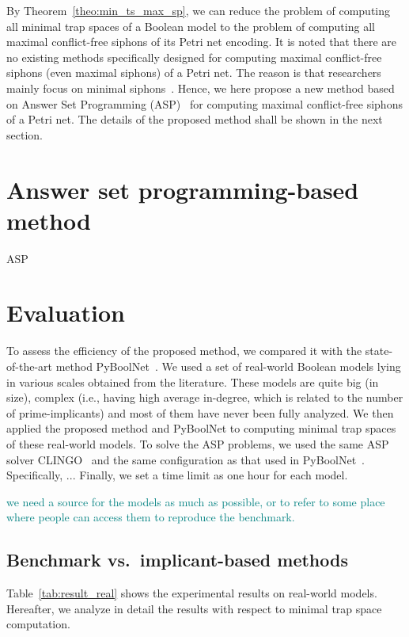 \documentclass[runningheads]{llncs}
\newcommand{\sylvain}[1]{\textcolor{teal}{#1}}
\begin{document}
By Theorem~\ref{theo:min_ts_max_sp}, we can reduce the problem of computing all minimal trap spaces of a Boolean model to the problem of computing all maximal conflict-free siphons of its Petri net encoding. It is noted that there are no existing methods specifically designed for computing maximal conflict-free siphons (even maximal siphons) of a Petri net. The reason is that researchers mainly focus on minimal siphons~\cite{DBLP:journals/isci/LiuB16}. Hence, we here propose a new method based on Answer Set Programming (ASP)~\cite{DBLP:journals/aicom/GebserKKOSS11} for computing  maximal conflict-free siphons of a Petri net. The details of the proposed method shall be shown in the next section.

\section{Answer set programming-based method}

ASP

\section{Evaluation}
To assess the efficiency of the proposed method, we compared it with the state-of-the-art method PyBoolNet~\cite{klarner2017pyboolnet}.
We used a set of real-world Boolean models lying in various scales obtained from the literature.
These models are quite big (in size), complex (i.e., having high average in-degree, which is related to the number of prime-implicants) and most of them have never been fully analyzed.
We then applied the proposed method and PyBoolNet to computing minimal trap spaces of these real-world models.
To solve the ASP problems, we used the same ASP solver CLINGO~\cite{DBLP:journals/aicom/GebserKKOSS11} and the same configuration as that used in PyBoolNet~\cite{klarner2015computing}.
Specifically, ...
Finally, we set a time limit as one hour for each model.

\sylvain{we need a source for the models as much as possible, or to refer to some place where people can access them to reproduce the benchmark.}

\subsection{Benchmark vs.\ implicant-based methods}

Table~\ref{tab:result_real} shows the experimental results on real-world models. Hereafter, we analyze in detail the results with respect to minimal trap space computation.
\end{document}
